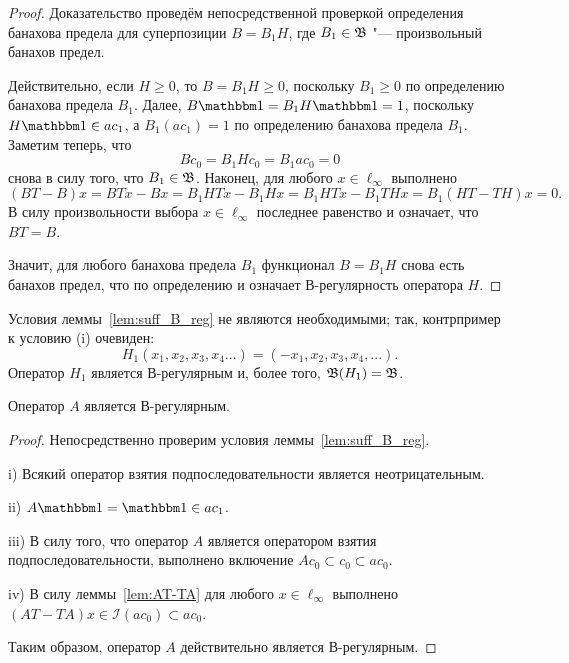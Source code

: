 \begin{proof}
	Доказательство проведём непосредственной проверкой определения банахова предела
	для суперпозиции $B = B_1 H$,
	где $B_1 \in \mathfrak{B}$ "--- произвольный банахов предел.

	Действительно, если $H\geq 0$, то $B = B_1 H \geq 0$,
	поскольку $B_1 \geq 0$ по определению банахова предела $B_1$.
	Далее, $B\one = B_1 H \one = 1$, поскольку $H\one \in ac_1$,
	а $B_1(ac_1) = 1$ по определению банахова предела $B_1$.
	Заметим теперь, что
	\begin{equation}
		Bc_0 = B_1 H c_0 = B_1 ac_0 = 0
	\end{equation}
	снова в силу того, что $B_1\in\mathfrak{B}$.
	Наконец, для любого $x\in\ell_\infty$ выполнено
	\begin{equation}
		(BT-B)x = BTx - Bx = B_1 HTx - B_1 H x = B_1 HTx - B_1 T H x = B_1 (HT -  T H) x = 0
		.
	\end{equation}
	В силу произвольности выбора $x\in \ell_\infty$ последнее равенство и означает, что $BT=B$.

	Значит, для любого банахова предела $B_1$ функционал $B=B_1 H$ снова есть банахов предел,
	что по определению
	и означает В-регулярность оператора $H$.
\end{proof}

\begin{remark}
	Условия леммы~\ref{lem:suff_B_reg} не являются необходимыми;
	так, контрпример к условию (i) очевиден:
	\begin{equation}
		H_1(x_1,x_2,x_3,x_4...) = (-x_1, x_2, x_3, x_4, ...)
		.
	\end{equation}
	Оператор $H_1$ является В-регулярным и, более того, $\mathfrak{B}(H_1) = \mathfrak{B}$.
\end{remark}


\begin{theorem}
	\label{thm:A_block_thrower_is_B-regular}
	Оператор $A$ является В-регулярным.
\end{theorem}

\begin{proof}
	Непосредственно проверим условия леммы~\ref{lem:suff_B_reg}.

	i) Всякий оператор взятия подпоследовательности является неотрицательным.

	ii) $A\one = \one \in ac_1$.

	iii)  В силу того, что оператор $A$ является оператором взятия подпоследовательности,
	выполнено включение $Ac_0 \subset c_0 \subset ac_0$.

	iv) В силу леммы~\ref{lem:AT-TA} для любого $x\in \ell_\infty$ выполнено $(AT-TA)x \in \mathcal{I}(ac_0) \subset ac_0$.

	Таким образом, оператор $A$ действительно является В-регулярным.
\end{proof}

